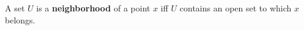 A set $U$ is a \textbf{neighborhood} of a point $x$ iff $U$ contains an open set to which $x$ belongs.
